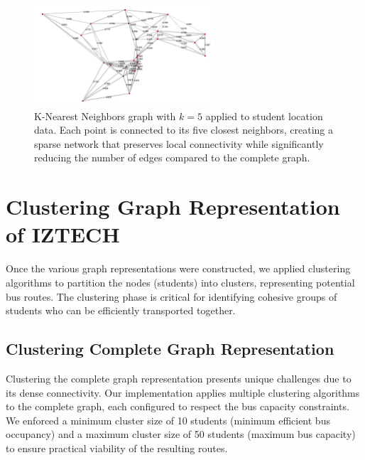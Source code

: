 \begin{figure}[!htbp]
\centering
\includegraphics[width=0.6\textwidth]{img/k_nearest}
\caption{K-Nearest Neighbors graph with $k=5$ applied to student location data. Each point is connected to its five closest neighbors, creating a sparse network that preserves local connectivity while significantly reducing the number of edges compared to the complete graph.}
\label{fig:knn_graph}
\end{figure}

\section{Clustering Graph Representation of IZTECH}
\label{sec:clustering_graph}

Once the various graph representations were constructed, we applied clustering algorithms to partition the nodes (students) into clusters, representing potential bus routes. The clustering phase is critical for identifying cohesive groups of students who can be efficiently transported together.

\subsection{Clustering Complete Graph Representation}
\label{subsec:clustering_complete}

Clustering the complete graph representation presents unique challenges due to its dense connectivity. Our implementation applies multiple clustering algorithms to the complete graph, each configured to respect the bus capacity constraints. We enforced a minimum cluster size of 10 students (minimum efficient bus occupancy) and a maximum cluster size of 50 students (maximum bus capacity) to ensure practical viability of the resulting routes.

